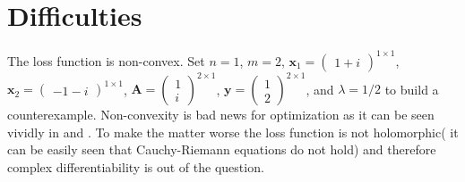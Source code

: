 \section{Difficulties}

The loss function is non-convex. Set $n=1$, $m=2$, $\boldsymbol{x}_1 = \begin{pmatrix}1+i\end{pmatrix}^{1 \times 1}$, 
$\boldsymbol{x}_2 = \begin{pmatrix}-1-i\end{pmatrix}^{1 \times 1}$, $\boldsymbol{A}=\begin{pmatrix}1\\i \end{pmatrix}^{2 \times 1}$, 
$\boldsymbol{y}=\begin{pmatrix}1\\2 \end{pmatrix}^{2 \times 1}$, and $\lambda=1/2$ to build a counterexample. Non-convexity is bad news for 
optimization as it can be seen vividly in \cite{Boyd2004} and \cite{Nocedal2006}. To make the matter worse the loss function is not 
holomorphic( it can be easily seen that Cauchy-Riemann equations\cite{Rudin1987} do not hold) and therefore complex differentiability 
is out of the question\cite{Rudin1987}.































